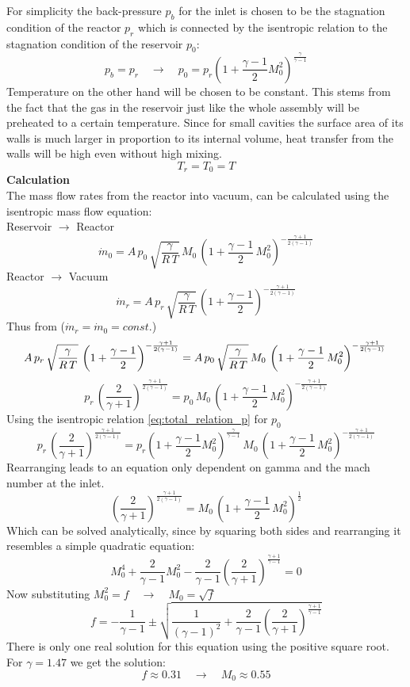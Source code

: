 \noindent For simplicity the back-pressure $p_b$ for the inlet is chosen to be the stagnation condition of the reactor $p_r$ which is connected by the isentropic relation to the stagnation condition of the reservoir $p_0$:
$$
	p_b = p_r
	\quad \to \quad
	p_0 = p_r \left(1 + \frac{\gamma - 1}{2}M_0^2 \right)^{\frac{\gamma}{\gamma - 1}}
$$
Temperature on the other hand will be chosen to be constant.
This stems from the fact that the gas in the reservoir just like the whole assembly will be preheated to a certain temperature.
Since for small cavities the surface area of its walls is much larger in proportion to its internal volume, heat transfer from the walls will be high even without high mixing.
$$
	T_r = T_0 = T
$$
\textbf{Calculation}\\
The mass flow rates from the reactor into vacuum, can be calculated using the isentropic mass flow equation:\\
Reservoir $\to$ Reactor
$$
	\dot{m}_0 = A\, p_0\, \sqrt{\frac{\gamma}{R\,T}}\, M_0\,\left(1+\frac{\gamma-1}{2}\,M_0^2\right)^{-\frac{\gamma+1}{2(\gamma-1)}}
$$
Reactor $\to$ Vacuum
$$
	\dot{m}_r = A\, p_r\, \sqrt{\frac{\gamma}{R\,T}}\,\left(1+\frac{\gamma-1}{2}\right)^{-\frac{\gamma+1}{2(\gamma-1)}}
$$
Thus from ($\dot{m}_r = \dot{m}_0 = const.$)
$$
	A\, p_r\, \sqrt{\frac{\gamma}{R\,T}}\,\left(1+\frac{\gamma-1}{2}\right)^{-\frac{\gamma+1}{2(\gamma-1)}}
	=  A\, p_0\, \sqrt{\frac{\gamma}{R\,T}}\, M_0\,\left(1+\frac{\gamma-1}{2}\,M_0^2\right)^{-\frac{\gamma+1}{2(\gamma-1)}}\\\\
$$
$$
	p_r\, \left(\frac{2}{\gamma+1}\right)^{\frac{\gamma+1}{2(\gamma-1)}}
	=  p_0\, M_0\,\left(1+\frac{\gamma-1}{2}\,M_0^2\right)^{-\frac{\gamma+1}{2(\gamma-1)}}
$$
Using the isentropic relation \eqref{eq:total_relation_p} for $p_0$
$$
	p_r\, \left(\frac{2}{\gamma+1}\right)^{\frac{\gamma+1}{2(\gamma-1)}}
	=  p_r \left(1 + \frac{\gamma - 1}{2}M_0^2 \right)^{\frac{\gamma}{\gamma - 1}}\, M_0\,\left(1+\frac{\gamma-1}{2}\,M_0^2\right)^{-\frac{\gamma+1}{2(\gamma-1)}}
$$
Rearranging leads to an equation only dependent on gamma and the mach number at the inlet.
$$
	\left(\frac{2}{\gamma+1}\right)^{\frac{\gamma+1}{2(\gamma-1)}}
	=  M_0\,\left(1+\frac{\gamma-1}{2}\,M_0^2\right)^{\frac{1}{2}}
$$
Which can be solved analytically, since by squaring both sides and rearranging it resembles a simple quadratic equation:
$$
	M_0^4 + \frac{2}{\gamma - 1}M_0^2 - \frac{2}{\gamma -1}\left(\frac{2}{\gamma + 1}\right)^{\frac{\gamma + 1}{\gamma - 1}} = 0
$$
Now substituting $M_0^2 = f \quad \to \quad M_0 = \sqrt{f}$
$$
	f = -\frac{1}{\gamma - 1} \pm \sqrt{\frac{1}{(\gamma - 1)^2}
	+ \frac{2}{\gamma -1}\left(\frac{2}{\gamma + 1}\right)^{\frac{\gamma + 1}{\gamma - 1}}}
$$
There is only one real solution for this equation using the positive square root.
For $\gamma = 1.47$ we get the solution:
$$
	f \approx 0.31 \quad \to \quad M_0 \approx 0.55
$$ 
